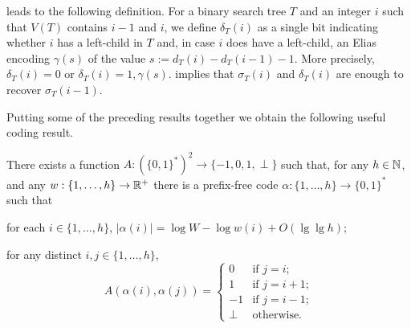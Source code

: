 \documentclass[kpfonts]{patmorin}
\begin{document}
 leads to the following definition. For a binary search tree $T$ and an integer $i$ such that $V(T)$ contains $i-1$ and $i$, we define $\delta_T(i)$ as
a single bit indicating whether $i$ has a left-child in $T$ and, in case $i$ does have a left-child, an Elias encoding $\gamma(s)$ of the value $s:=d_T(i)-d_T(i-1)-1$.  More precisely, $\delta_T(i)=0$ or $\delta_T(i)=1,\gamma(s)$.  implies that $\sigma_T(i)$ and $\delta_T(i)$ are enough to recover $\sigma_T(i-1)$.

\smallskip

Putting some of the preceding results together we obtain the following useful coding result.

\begin{lem}
  There exists a function $A:(\{0,1\}^*)^2\to\{-1,0,1,\perp\}$ such that, for any $h\in\mathbb{N}$, and any $w:\{1,\ldots,h\}\to\mathbb{R}^+$ there is a prefix-free code $\alpha:\{1,\ldots,h\}\to \{0,1\}^*$ such that 
  \begin{compactenum}
    \item for each $i\in\{1,\ldots,h\}$, $|\alpha(i)|=\log W -\log w(i) + O(\lg\lg h)$;
    \item for any distinct $i,j\in\{1,\ldots,h\}$, 
    \[   A(\alpha(i),\alpha(j)) 
    = \begin{cases}
       0 & \text{if $j=i$;}\\
       1 & \text{if $j=i+1$;} \\
       -1 & \text{if $j=i-1$;} \\
       \perp & \text{otherwise.}
      \end{cases}
      \]
    \end{compactenum}
\end{lem}
\end{document}
